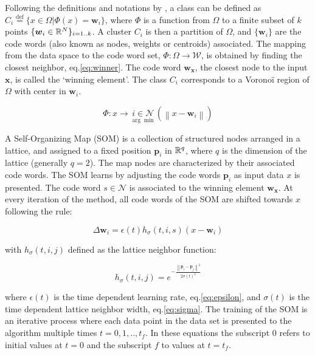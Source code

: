 Following the definitions and notations by \citep{Villmann2006}, a class can be defined as $C_i\overset{\text{def}}{=} \{x\in\Omega | \Phi(x)=\boldsymbol{w}_i\}$, where $\Phi$ is a function from $\Omega$ to a finite subset of $k$ points $\{\boldsymbol{w}_i\in\Bbb R^N\}_{i=1..k}$. A cluster $C_i$ is then a partition of $\Omega$, and $\{\boldsymbol{w}_i\}$ are the code words (also known as nodes, weights or centroids) associated. The mapping from the data space to the code word set, $\Phi: \Omega\rightarrow\mathcal{W}$, is obtained by finding the closest neighbor, eq.\eqref{eq:winner}. The code word $\boldsymbol{w_x}$, the closest node to the input $\boldsymbol{x}$, is called the `winning element'. The class $C_i$ corresponds to a Vorono\"i region of $\Omega$ with center in $\boldsymbol{w}_i$.

\begin{equation}
\Phi: x \rightarrow  \underset{\arg\min}{i\in\mathcal{N}}\left( \left\lVert x - \boldsymbol{w}_i \right\rVert \right) \label{eq:winner}
\end{equation}

A Self-Organizing Map (SOM) is a collection of structured nodes arranged in a lattice, and assigned to a fixed position $\boldsymbol{p}_i$ in $\Bbb R^q$, where $q$ is the dimension of the lattice (generally $q=2$). The map nodes are characterized by their associated code words. The SOM learns by adjusting the code words $\boldsymbol{p}_i$ as input data $x$ is presented. The code word $s \in \mathcal{N}$ is associated to the winning element $\boldsymbol{w_x}$. At every iteration of the method, all code words of the SOM are shifted towards $x$ following the rule:

\begin{equation}
\Delta \boldsymbol{w}_i = \epsilon(t)h_\sigma(t,i,s)(x-\boldsymbol{w}_i) \label{eq:learnsom}
\end{equation}

with $h_\sigma(t,i,j)$ defined as the lattice neighbor function:

\begin{equation}
h_\sigma(t,i,j) = e^{-\frac{\left\lVert \boldsymbol{p}_i - \boldsymbol{p}_j \right\rVert^2}{2\sigma(t)^2}} \label{eq:neigsom}
\end{equation}

where $\epsilon(t)$ is the time dependent learning rate, eq.\eqref{eq:epsilon}, and $\sigma(t)$ is the time dependent lattice neighbor width, eq.\eqref{eq:sigma}. The training of the SOM is an iterative process where each data point in the data set is presented to the algorithm multiple times $t={0, 1,..,t_f}$. In these equations the subscript $0$ refers to initial values at $t=0$ and the subscript $f$ to values at $t=t_f$.

